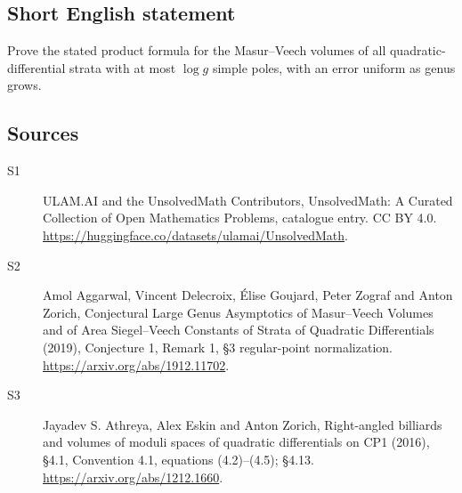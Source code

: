 \documentclass[11pt]{article}
\begin{document}
\subsection{Short English statement}
Prove the stated product formula for the Masur--Veech volumes of all quadratic-differential strata with at most $\log g$ simple poles, with an error uniform as genus grows.
\subsection{Sources}
\begin{description}
\item[\hypertarget{source:statement:1}{S1}] ULAM.AI and the UnsolvedMath Contributors, UnsolvedMath: A Curated Collection of Open Mathematics Problems, catalogue entry. CC BY 4.0. \url{https://huggingface.co/datasets/ulamai/UnsolvedMath}.
\item[\hypertarget{source:statement:2}{S2}] Amol Aggarwal, Vincent Delecroix, Élise Goujard, Peter Zograf and Anton Zorich, Conjectural Large Genus Asymptotics of Masur–Veech Volumes and of Area Siegel–Veech Constants of Strata of Quadratic Differentials (2019), Conjecture 1, Remark 1, §3 regular-point normalization. \url{https://arxiv.org/abs/1912.11702}.
\item[\hypertarget{source:statement:3}{S3}] Jayadev S. Athreya, Alex Eskin and Anton Zorich, Right-angled billiards and volumes of moduli spaces of quadratic differentials on CP1 (2016), §4.1, Convention 4.1, equations (4.2)–(4.5); §4.13. \url{https://arxiv.org/abs/1212.1660}.
\end{description}
\label{end:statement}
\end{document}
